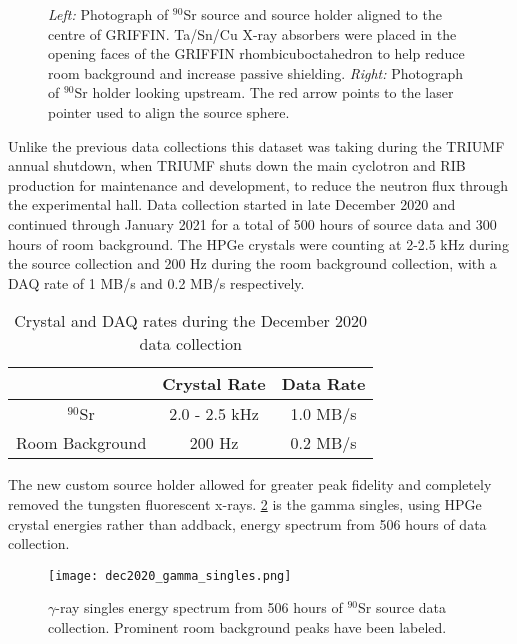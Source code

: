 \documentclass[cnatzke_thesis_proposal.tex]{subfiles}
\begin{document}
\begin{figure}[htbp]
  \centering
  \qquad
  \caption{
    \textit{Left:} Photograph of $^{90}$Sr source and source holder aligned to the centre of GRIFFIN. Ta/Sn/Cu X-ray absorbers were placed in the opening faces of the GRIFFIN rhombicuboctahedron to help reduce room background and increase passive shielding.
    \textit{Right:} Photograph of $^{90}$Sr holder looking upstream. The red arrow points to the laser pointer used to align the source sphere.
  }
  \label{fig:source_holder_in_griffin}
\end{figure}

Unlike the previous data collections this dataset was taking during the TRIUMF annual shutdown, when TRIUMF shuts down the main cyclotron and RIB production for maintenance and development, to reduce the neutron flux through the experimental hall. Data collection started in late December 2020 and continued through January 2021 for a total of 500 hours of source data and 300 hours of room background. The HPGe crystals were counting at 2-2.5 kHz during the source collection and 200 Hz during the room background collection, with a DAQ rate of 1 MB/s and 0.2 MB/s respectively.

\begin{table}[]
  \begin{tabular}{ccc}
                  & \textbf{Crystal Rate} & \textbf{Data Rate} \\ \hline
  $^{90}$Sr       & 2.0 - 2.5 kHz         & 1.0 MB/s           \\
  Room Background & 200 Hz                & 0.2 MB/s          
  \end{tabular}
  \caption{Crystal and DAQ rates during the December 2020 data collection}
  \label{tab:dec2020_rates}
\end{table}

The new custom source holder allowed for greater peak fidelity and completely removed the tungsten fluorescent x-rays. 
\ref{fig:dec2020_gamma_singles} is the gamma singles, using HPGe crystal energies rather than addback, energy spectrum from 506 hours of data collection.

\begin{figure}[htbp]
  \centering
  \texttt{[image: dec2020\_gamma\_singles.png]}
  \caption{$\gamma$-ray singles energy spectrum from 506 hours of $^{90}$Sr source data collection. Prominent room background peaks have been labeled.}
  \label{fig:dec2020_gamma_singles}
\end{figure}
\end{document}
